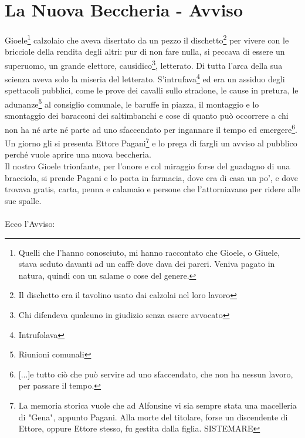 
\chapter{La Nuova Beccheria - Avviso}
Gioele\footnote{Quelli che l'hanno conosciuto, mi hanno raccontato che Gioele, o Giuele, stava seduto davanti ad un caffè dove dava dei pareri. Veniva pagato in natura, quindi con un salame o cose del genere.} calzolaio che aveva disertato da un pezzo il dischetto\footnote{Il dischetto era il tavolino usato dai calzolai nel loro lavoro} per vivere con le bricciole della rendita degli altri: pur di non fare nulla, si peccava di essere un superuomo, un grande elettore, causidico\footnote{Chi difendeva qualcuno in giudizio senza essere avvocato}, letterato. Di tutta l'arca della sua scienza aveva solo la miseria del letterato. S'intrufava\footnote{Intrufolava} ed era un assiduo degli spettacoli pubblici, come le prove dei cavalli sullo stradone, le cause in pretura, le adunanze\footnote{Riunioni comunali} al consiglio comunale, le baruffe in piazza, il montaggio e lo smontaggio dei baracconi dei saltimbanchi e cose di quanto può occorrere a chi non ha né arte né parte ad uno sfaccendato per ingannare il tempo ed emergere\footnote{[...]e tutto ciò che può servire ad uno sfaccendato, che non ha nessun lavoro, per passare il tempo.}.\\
\indent Un giorno gli si presenta Ettore Pagani\footnote{La memoria storica vuole che ad Alfonsine vi sia sempre stata una macelleria di "Gena", appunto Pagani. Alla morte del titolare, forse un discendente di Ettore, oppure Ettore stesso, fu gestita dalla figlia. SISTEMARE} e lo prega di fargli un avviso al pubblico perché vuole aprire una nuova beccheria. \\
\indent Il nostro Gioele trionfante, per l'onore e col miraggio forse del guadagno di una bracciola, si prende Pagani e lo porta in farmacia, dove era di casa un po', e dove trovava gratis, carta, penna e calamaio e persone che l'attorniavano per ridere alle sue spalle.\\
\\
Ecco l'Avviso:

 \normalsize \normalfont 

